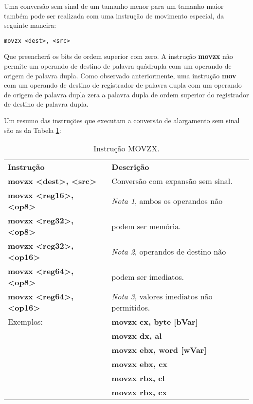 Uma conversão sem sinal de um tamanho menor para um tamanho maior também pode ser realizada com uma instrução de movimento especial, da seguinte maneira:
\begin{lstlisting}
movzx <dest>, <src>
\end{lstlisting}

Que preencherá os bits de ordem superior com zero. A instrução \textbf{movzx} não permite um operando de destino de palavra quádrupla com um operando de origem de palavra dupla. Como observado anteriormente, uma instrução \textbf{mov} com um operando de destino de registrador de palavra dupla com um operando de origem de palavra dupla zera a palavra dupla de ordem superior do registrador de destino de palavra dupla.

Um resumo das instruções que executam a conversão de alargamento sem sinal são as da Tabela \ref{tab:movzx}:

\begin{table}[ht]
	\begin{center}
		\begin{tabular}{|ll|}
			\hline
			\rowcolor[HTML]{C0C0C0}
			\textbf{Instrução} & \textbf{Descrição} \\ 
			\textbf{movzx <dest>, <src>} & Conversão com expansão sem sinal.\\
			\textbf{movzx <reg16>, <op8>} &\textit{Nota 1}, ambos os operandos não \\
			\textbf{movzx <reg32>, <op8>} &podem ser memória.\\
			\textbf{movzx <reg32>, <op16>} &\textit{Nota 2}, operandos de destino não \\
			\textbf{movzx <reg64>, <op8>} &podem ser imediatos.\\
			\textbf{movzx <reg64>, <op16>} &\textit{Nota 3}, valores imediatos não permitidos.\\ \hline
			Exemplos:& \textbf{movzx cx, byte [bVar]}\\
			& \textbf{movzx dx, al}\\
			& \textbf{movzx ebx, word [wVar]}\\
			& \textbf{movzx ebx, cx}\\
			& \textbf{movzx rbx, cl}\\
			& \textbf{movzx rbx, cx}\\ \hline				
		\end{tabular}%
	\end{center}
	\caption{Instrução MOVZX.}
	\label{tab:movzx}
\end{table}


